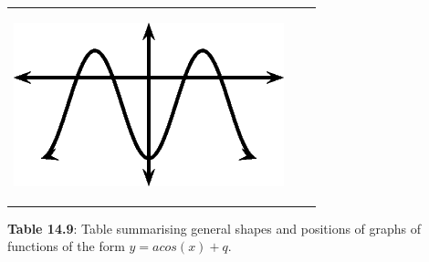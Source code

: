 \begin{center}
\begin{xtabular*}{\mytablewidth}[t]{|p{10\mystarwidth}|p{10\mystarwidth}|p{10\mystarwidth}|}
        
                  
    \setcounter{subfigure}{0}

\label{m39414*id88246}
    \begin{center}
    \label{m39414*id88246!!!underscore!!!media}\label{m39414*id88246!!!underscore!!!printimage}\includegraphics{col11306.imgs/m39414_MG10C15_029.png} %
        
      \vspace{2pt}
    \vspace{.1in}
    
    \end{center}



    \addtocounter{footnote}{-0}
    
     \tabularnewline{}
    \end{xtabular*}
      \end{center}
    \begin{center}{\small\bfseries Table 14.9}: Table summarising general shapes and positions of graphs of functions of the form \begin{math}y=acos\left(x\right)+q\end{math}.\end{center}
    
    \addtocounter{footnote}{-0}
    
    \par
  
        \label{m39414*uid66}
            \nopagebreak
            
